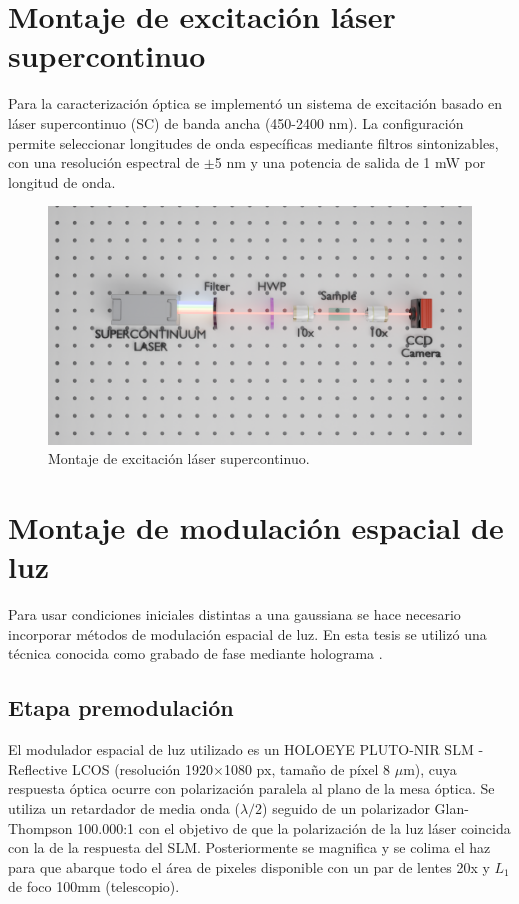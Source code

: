 \section{Montaje de excitación láser supercontinuo}

Para la caracterización óptica se implementó un sistema de excitación basado en láser supercontinuo (SC) de banda ancha (450-2400 nm). La configuración permite seleccionar longitudes de onda específicas mediante filtros sintonizables, con una resolución espectral de $\pm$5 nm y una potencia de salida de 1 mW por longitud de onda.

\begin{figure}[H]
    \centering
    \includegraphics[width=\linewidth, trim={5cm 9cm 3cm 7cm},clip]{media/SC_setup}
    \caption{Montaje de excitación láser supercontinuo.}
\end{figure}

\section{Montaje de modulación espacial de luz}

Para usar condiciones iniciales distintas a una gaussiana se hace necesario incorporar métodos de modulación espacial de luz. En esta tesis se utilizó una técnica conocida como grabado de fase mediante holograma \citep{terhalle}.

\subsection{Etapa premodulación}
El modulador espacial de luz utilizado es un HOLOEYE PLUTO-NIR SLM - Reflective LCOS (resolución 1920$\times$1080 px, tamaño de píxel 8 $\mu$m), cuya respuesta óptica ocurre con polarización paralela al plano de la mesa óptica. Se utiliza un retardador de media onda ($\lambda/2$) seguido de un polarizador Glan-Thompson 100.000:1 con el objetivo de que la polarización de la luz láser coincida con la de la respuesta del SLM. Posteriormente se magnifica y se colima el haz para que abarque todo el área de pixeles disponible con un par de lentes 20x y $L_1$ de foco 100mm (telescopio).


